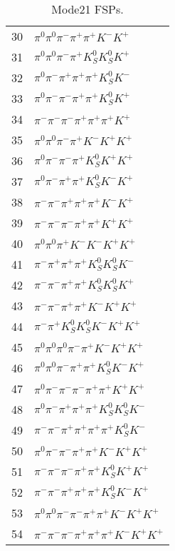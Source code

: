 \begin{table}[h!]
\begin{center}
\begin{tabular}{cl}
30 & $\pi^0 \pi^0 \pi^- \pi^+ \pi^+ K^- K^+ $ \\
31 & $\pi^0 \pi^0 \pi^- \pi^+ K_S^0 K_S^0 K^+ $ \\
32 & $\pi^0 \pi^- \pi^+ \pi^+ \pi^+ K_S^0 K^- $ \\
33 & $\pi^0 \pi^- \pi^- \pi^+ \pi^+ K_S^0 K^+ $ \\
34 & $\pi^- \pi^- \pi^- \pi^+ \pi^+ \pi^+ K^+ $ \\
35 & $\pi^0 \pi^0 \pi^- \pi^+ K^- K^+ K^+ $ \\
36 & $\pi^0 \pi^- \pi^- \pi^+ K_S^0 K^+ K^+ $ \\
37 & $\pi^0 \pi^- \pi^+ \pi^+ K_S^0 K^- K^+ $ \\
38 & $\pi^- \pi^- \pi^+ \pi^+ \pi^+ K^- K^+ $ \\
39 & $\pi^- \pi^- \pi^- \pi^+ \pi^+ K^+ K^+ $ \\
40 & $\pi^0 \pi^0 \pi^+ K^- K^- K^+ K^+ $ \\
41 & $\pi^- \pi^+ \pi^+ \pi^+ K_S^0 K_S^0 K^- $ \\
42 & $\pi^- \pi^- \pi^+ \pi^+ K_S^0 K_S^0 K^+ $ \\
43 & $\pi^- \pi^- \pi^+ \pi^+ K^- K^+ K^+ $ \\
44 & $\pi^- \pi^+ K_S^0 K_S^0 K^- K^+ K^+ $ \\
45 & $\pi^0 \pi^0 \pi^0 \pi^- \pi^+ K^- K^+ K^+ $ \\
46 & $\pi^0 \pi^0 \pi^- \pi^+ \pi^+ K_S^0 K^- K^+ $ \\
47 & $\pi^0 \pi^- \pi^- \pi^- \pi^+ \pi^+ K^+ K^+ $ \\
48 & $\pi^0 \pi^- \pi^+ \pi^+ \pi^+ K_S^0 K_S^0 K^- $ \\
49 & $\pi^- \pi^- \pi^+ \pi^+ \pi^+ \pi^+ K_S^0 K^- $ \\
50 & $\pi^0 \pi^- \pi^- \pi^+ \pi^+ K^- K^+ K^+ $ \\
51 & $\pi^- \pi^- \pi^- \pi^+ \pi^+ K_S^0 K^+ K^+ $ \\
52 & $\pi^- \pi^- \pi^+ \pi^+ \pi^+ K_S^0 K^- K^+ $ \\
53 & $\pi^0 \pi^0 \pi^- \pi^- \pi^+ \pi^+ K^- K^+ K^+ $ \\
54 & $\pi^- \pi^- \pi^- \pi^+ \pi^+ \pi^+ K^- K^+ K^+ $ \\
\hline
\end{tabular}
\label{tab:Mode21FSPs}
\caption{Mode21 FSPs.}
\end{center}
\end{table}
